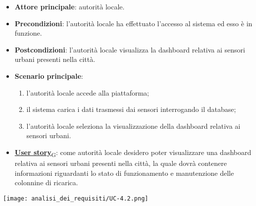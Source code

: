 \begin{itemize}
	\item \textbf{Attore principale}: autorità locale.
	\item \textbf{Precondizioni}: l'autorità locale ha effettuato l'accesso al sistema ed esso è in funzione.
	\item \textbf{Postcondizioni}: l'autorità locale visualizza la dashboard relativa
	      ai sensori urbani presenti nella città.
	\item \textbf{Scenario principale}:
	      \begin{enumerate}
		      \item l'autorità locale accede alla piattaforma;
		      \item il sistema carica i dati trasmessi dai sensori interrogando il database;
		      \item l'autorità locale seleziona la visualizzazione della dashboard relativa ai sensori urbani.
	      \end{enumerate}
	\item \href{https://7last.github.io/docs/pb/documentazione-interna/glossario\#user-story}{\textbf{User story}\textsubscript{G}}:
	      come autorità locale desidero poter visualizzare una dashboard relativa ai sensori urbani presenti nella città, la quale
	      dovrà contenere informazioni riguardanti lo stato di funzionamento e manutenzione delle colonnine di ricarica.
\end{itemize}
\begin{center}
	\texttt{[image: analisi\_dei\_requisiti/UC-4.2.png]}
\end{center}


